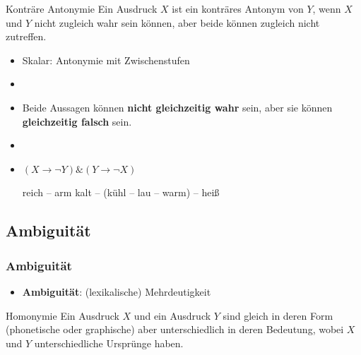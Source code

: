 
\begin{frame}

\begin{block}{Konträre Antonymie}
Ein Ausdruck $X$ ist ein konträres Antonym von $Y$, wenn $X$ und $Y$ nicht zugleich wahr sein können, aber beide können zugleich nicht zutreffen.
\end{block}

\begin{itemize}
	\item Skalar: Antonymie mit Zwischenstufen
	\item[]
	\item Beide Aussagen können \textbf{nicht gleichzeitig wahr} sein, aber sie können \textbf{gleichzeitig falsch} sein.
	\item[]
	\item $(X \rightarrow \lnot Y) \& (Y \rightarrow \lnot X)$
	
	\eal
		\ex reich -- arm
		\ex kalt -- (kühl -- lau -- warm) -- heiß
	\zl
	
\end{itemize}

\end{frame}


%
\subsection{Ambiguität}
%

\begin{frame}
\frametitle{Ambiguität}

\begin{itemize}
	\item \textbf{Ambiguität}: (lexikalische) Mehrdeutigkeit
\end{itemize}	

	
\begin{block}{Homonymie}
Ein Ausdruck $X$ und ein Ausdruck $Y$ sind gleich in deren Form (phonetische oder graphische) aber unterschiedlich in deren Bedeutung, wobei $X$ und $Y$ unterschiedliche Ursprünge haben.
\end{block}


\end{frame}


